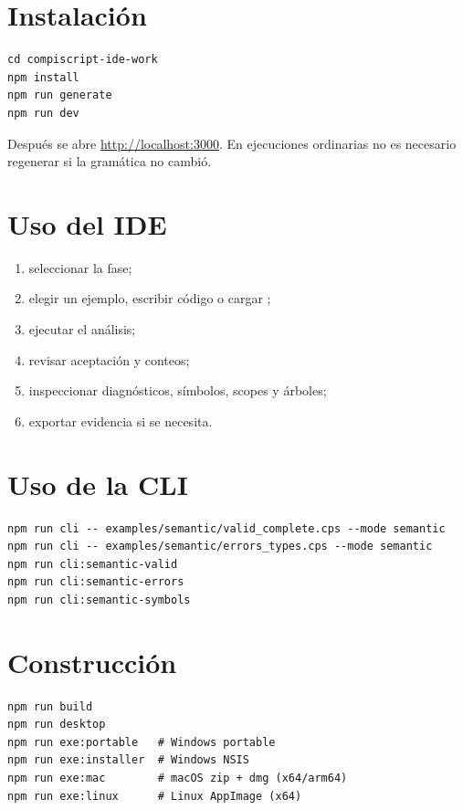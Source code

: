 \documentclass[11pt,letterpaper,oneside]{report}
\newcommand{\archivo}[1]{\path{#1}}
\begin{document}
\section{Instalación}

\begin{verbatim}
cd compiscript-ide-work
npm install
npm run generate
npm run dev
\end{verbatim}

Después se abre \url{http://localhost:3000}. En ejecuciones ordinarias no es necesario
regenerar si la gramática no cambió.

\section{Uso del IDE}

\begin{enumerate}
  \item seleccionar la fase;
  \item elegir un ejemplo, escribir código o cargar \archivo{.cps};
  \item ejecutar el análisis;
  \item revisar aceptación y conteos;
  \item inspeccionar diagnósticos, símbolos, scopes y árboles;
  \item exportar evidencia si se necesita.
\end{enumerate}

\section{Uso de la CLI}

\begin{verbatim}
npm run cli -- examples/semantic/valid_complete.cps --mode semantic
npm run cli -- examples/semantic/errors_types.cps --mode semantic
npm run cli:semantic-valid
npm run cli:semantic-errors
npm run cli:semantic-symbols
\end{verbatim}

\section{Construcción}

\begin{verbatim}
npm run build
npm run desktop
npm run exe:portable   # Windows portable
npm run exe:installer  # Windows NSIS
npm run exe:mac        # macOS zip + dmg (x64/arm64)
npm run exe:linux      # Linux AppImage (x64)
\end{verbatim}
\end{document}
